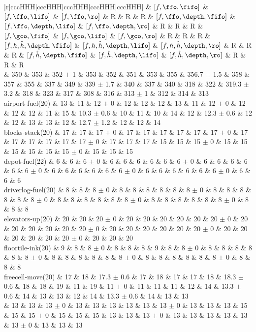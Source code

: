 \begin{center}
\begin{tabular}{|r|cccHHH|cccHHH|cccHHH|cccHHH|cccHHH|}
 & $[f,\ffo,\fifo]$ & $[f,\ffo,\lifo]$ & $[f,\ffo,\ro]$ & R & R & R & $[f,\ffo,\depth,\fifo]$ & $[f,\ffo,\depth,\lifo]$ & $[f,\ffo,\depth,\ro]$ & R & R & R & $[f,\gco,\fifo]$ & $[f,\gco,\lifo]$ & $[f,\gco,\ro]$ & R & R & R & $[f,h,\hat{h},\depth,\fifo]$ & $[f,h,\hat{h},\depth,\lifo]$ & $[f,h,\hat{h},\depth,\ro]$ & R & R & R & $[f,\hat{h},\depth,\fifo]$ & $[f,\hat{h},\depth,\lifo]$ & $[f,\hat{h},\depth,\ro]$ & R & R & R\\
\hline
 & 350 & 353 & 352 $\pm$ 1 & 353 & 352 & 351 & 353 & 355 & 356.7 $\pm$ 1.5 & 358 & 357 & 355 & 337 & 349 & 339 $\pm$ 1.7 & 340 & 337 & 340 & 318 & 322 & 319.3 $\pm$ 3.2 & 318 & 323 & 317 & 308 & 316 & 313 $\pm$ 1 & 312 & 314 & 313\\
\hline
airport-fuel(20) & 13 & 11 & 12 $\pm$ 0 & 12 & 12 & 12 & 13 & 11 & 12 $\pm$ 0 & 12 & 12 & 12 & 11 & 15 & 10.3 $\pm$ 0.6 & 10 & 11 & 10 & 14 & 12 & 12.3 $\pm$ 0.6 & 12 & 12 & 13 & 13 & 12 & 12.7 $\pm$ 1.2 & 12 & 12 & 14\\
blocks-stack(20) & 17 & 17 & 17 $\pm$ 0 & 17 & 17 & 17 & 17 & 17 & 17 $\pm$ 0 & 17 & 17 & 17 & 17 & 17 & 17 $\pm$ 0 & 17 & 17 & 17 & 15 & 15 & 15 $\pm$ 0 & 15 & 15 & 15 & 15 & 15 & 15 $\pm$ 0 & 15 & 15 & 15\\
depot-fuel(22) & 6 & 6 & 6 $\pm$ 0 & 6 & 6 & 6 & 6 & 6 & 6 $\pm$ 0 & 6 & 6 & 6 & 6 & 6 & 6 $\pm$ 0 & 6 & 6 & 6 & 6 & 6 & 6 $\pm$ 0 & 6 & 6 & 6 & 6 & 6 & 6 $\pm$ 0 & 6 & 6 & 6\\
driverlog-fuel(20) & 8 & 8 & 8 $\pm$ 0 & 8 & 8 & 8 & 8 & 8 & 8 $\pm$ 0 & 8 & 8 & 8 & 8 & 8 & 8 $\pm$ 0 & 8 & 8 & 8 & 8 & 8 & 8 $\pm$ 0 & 8 & 8 & 8 & 8 & 8 & 8 $\pm$ 0 & 8 & 8 & 8\\
elevators-up(20) & 20 & 20 & 20 $\pm$ 0 & 20 & 20 & 20 & 20 & 20 & 20 $\pm$ 0 & 20 & 20 & 20 & 20 & 20 & 20 $\pm$ 0 & 20 & 20 & 20 & 20 & 20 & 20 $\pm$ 0 & 20 & 20 & 20 & 20 & 20 & 20 $\pm$ 0 & 20 & 20 & 20\\
floortile-ink(20) & 9 & 8 & 8 $\pm$ 0 & 8 & 8 & 8 & 9 & 8 & 8 $\pm$ 0 & 8 & 8 & 8 & 8 & 8 & 8 $\pm$ 0 & 8 & 8 & 8 & 8 & 8 & 8 $\pm$ 0 & 8 & 8 & 8 & 8 & 8 & 8 $\pm$ 0 & 8 & 8 & 8\\
freecell-move(20) & 17 & 18 & 17.3 $\pm$ 0.6 & 17 & 18 & 17 & 17 & 18 & 18.3 $\pm$ 0.6 & 18 & 18 & 19 & 11 & 19 & 11 $\pm$ 0 & 11 & 11 & 11 & 12 & 14 & 13.3 $\pm$ 0.6 & 14 & 13 & 13 & 12 & 14 & 13.3 $\pm$ 0.6 & 14 & 13 & 13\\
 & 13 & 13 & 13 $\pm$ 0 & 13 & 13 & 13 & 13 & 13 & 13 $\pm$ 0 & 13 & 13 & 13 & 15 & 15 & 15 $\pm$ 0 & 15 & 15 & 15 & 13 & 13 & 13 $\pm$ 0 & 13 & 13 & 13 & 13 & 13 & 13 $\pm$ 0 & 13 & 13 & 13\\

\end{tabular}
\end{center}
